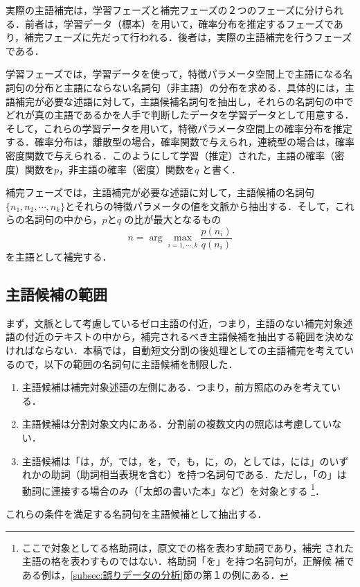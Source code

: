 実際の主語補完は，学習フェーズと補完フェーズの２つのフェーズに分けられる．前者は，学習データ（標本）を用いて，確率分布を推定するフェーズであり，補完フェーズに先だって行われる．後者は，実際の主語補完を行うフェーズである．

学習フェーズでは，学習データを使って，特徴パラメータ空間上で主語になる名詞句の分布と主語にならない名詞句（非主語）の分布を求める．具体的には，主語補完が必要な述語に対して，主語候補名詞句を抽出し，それらの名詞句の中でどれが真の主語であるかを人手で判断したデータを学習データとして用意する．そして，これらの学習データを用いて，特徴パラメータ空間上の確率分布を推定する．確率分布は，離散型の場合，確率関数で与えられ，連続型の場合は，確率密度関数で与えられる．このようにして学習（推定）された，主語の確率（密度）関数を$p$，非主語の確率（密度）関数を$q$ と書く．

補完フェーズでは，主語補完が必要な述語に対して，主語候補の名詞句$\{n_{1},n_{2},\cdots ,n_{k}\}$とそれらの特徴パラメータの値を文脈から抽出する．そして，これらの名詞句の中から，$p$と$q$ の比が最大となるもの
\begin{equation}
 n = \arg\max_{i=1, \cdots ,k} \frac{p(n_{i})}{q(n_{i})}
                                             \label{eq:尤度比}
\end{equation}
を主語として補完する．

\subsection{主語候補の範囲} \label{subsec:主語候補の範囲}
まず，文脈として考慮しているゼロ主語の付近，つまり，主語のない補完対象述語の付近のテキストの中から，補完されるべき主語候補を抽出する範囲を決めなければならない．本稿では，自動短文分割の後処理としての主語補完を考えているので，以下の範囲の名詞句に主語候補を制限した．
\begin{enumerate}
\item 主語候補は補完対象述語の左側にある．つまり，前方照応のみを考えている．
\item 主語候補は分割対象文内にある．分割前の複数文内の照応は考慮していない．
\item 主語候補は「は，が，では，を，で，も，に，の，としては，には」のいずれかの助詞（助詞相当表現を含む）を持つ名詞句である．ただし，「の」は動詞に連接する場合のみ（「太郎の書いた本」など）を対象とする
\footnote{ここで対象としてる格助詞は，原文での格を表わす助詞であり，補完
  された主語の格を表わすものではない．格助詞「を」を持つ名詞句が，正解候
  補である例は，\ref{subsec:誤りデータの分析}節の第１の例にある．}．
\end{enumerate}
これらの条件を満足する名詞句を主語候補として抽出する．

